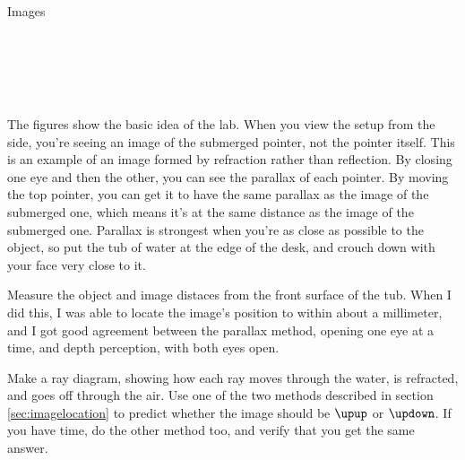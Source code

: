\begin{lab}[0]{Images}\label{lab:images}

\apparatus
{}\\
\\
\\
\\



The figures show the basic idea of the lab. When you view the setup
from the side, you're seeing an image of the submerged pointer, not the
pointer itself. This is an example of an image formed by refraction rather than
reflection.
By closing one eye and then the other, you can see the
parallax of each pointer. By moving the top pointer, you can get it to have
the same parallax as the image of the submerged one, which means it's at the same
distance as the image of the submerged one. Parallax is strongest when you're
as close as possible to the object, so put the tub of water at the edge of the
desk, and crouch down with your face very close to it.



Measure the object and image distaces from the front surface of the tub.
When I did this, I was able to locate the image's position to within about
a millimeter, and I got good agreement between the parallax method, opening
one eye at a time, and depth perception, with both eyes open.


Make a ray diagram, showing how each ray moves through the water, is refracted, and
goes off through the air.
Use one of the two methods described in section \ref{sec:imagelocation} to predict
whether the image should be $\upup$ or $\updown$. 
If you have time, do the other method too, and verify that you get the same
answer.



\end{lab}
